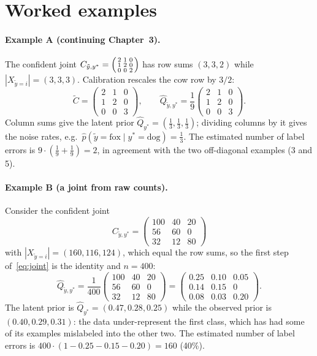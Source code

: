 \documentclass[11pt,a4paper]{report}
\newcommand{\Cyy}{C_{\tilde y,y^*}}
\newcommand{\1}{\mathbf 1}
\theoremstyle{definition}
\theoremstyle{plain}
\theoremstyle{remark}
\begin{document}
\section{Worked examples}
\paragraph{Example A (continuing Chapter~3).} The confident joint $\Cyy=\begin{psmallmatrix}2&1&0\\1&2&0\\0&0&2\end{psmallmatrix}$ has row sums $(3,3,2)$ while $|X_{\tilde y=i}|=(3,3,3)$. Calibration rescales the cow row by $3/2$:
\[
\tilde C=\begin{pmatrix}2&1&0\\1&2&0\\0&0&3\end{pmatrix},\qquad
\hat Q_{\tilde y,y^*}=\frac19\begin{pmatrix}2&1&0\\1&2&0\\0&0&3\end{pmatrix}.
\]
Column sums give the latent prior $\hat Q_{y^*}=(\tfrac13,\tfrac13,\tfrac13)$; dividing columns by it gives the noise rates, e.g.\ $\hat p(\tilde y=\text{fox}\mid y^*=\text{dog})=\tfrac13$. The estimated number of label errors is $9\cdot(\tfrac19+\tfrac19)=2$, in agreement with the two off-diagonal examples (3 and 5).

\paragraph{Example B (a joint from raw counts).} Consider the confident joint
\[
\Cyy=\begin{pmatrix}100&40&20\\56&60&0\\32&12&80\end{pmatrix}
\]
with $|X_{\tilde y=i}|=(160,116,124)$, which equal the row sums, so the first step of~\eqref{eq:joint} is the identity and $n=400$:
\[
\hat Q_{\tilde y,y^*}=\frac{1}{400}\begin{pmatrix}100&40&20\\56&60&0\\32&12&80\end{pmatrix}
=\begin{pmatrix}0.25&0.10&0.05\\0.14&0.15&0\\0.08&0.03&0.20\end{pmatrix}.
\]
The latent prior is $\hat Q_{y^*}=(0.47,0.28,0.25)$ while the observed prior is $(0.40,0.29,0.31)$: the data under-represent the first class, which has had some of its examples mislabeled into the other two. The estimated number of label errors is $400\cdot(1-0.25-0.15-0.20)=160$ (40\%).
\end{document}
